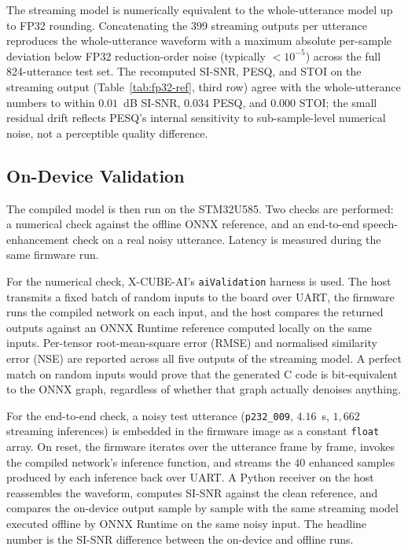 \documentclass[conference]{IEEEtran}
\begin{document}
The streaming model is numerically equivalent to the whole-utterance model up to FP32 rounding. Concatenating the 399 streaming outputs per utterance reproduces the whole-utterance waveform with a maximum absolute per-sample deviation below FP32 reduction-order noise (typically $<10^{-5}$) across the full 824-utterance test set. The recomputed SI-SNR, PESQ, and STOI on the streaming output (Table~\ref{tab:fp32-ref}, third row) agree with the whole-utterance numbers to within $0.01$~dB SI-SNR, $0.034$ PESQ, and $0.000$ STOI; the small residual drift reflects PESQ's internal sensitivity to sub-sample-level numerical noise, not a perceptible quality difference.


\subsection{On-Device Validation}
The compiled model is then run on the STM32U585. Two checks are performed: a numerical check against the offline ONNX reference, and an end-to-end speech-enhancement check on a real noisy utterance. Latency is measured during the same firmware run.

For the numerical check, X-CUBE-AI's \texttt{aiValidation} harness is used. The host transmits a fixed batch of random inputs to the board over UART, the firmware runs the compiled network on each input, and the host compares the returned outputs against an ONNX Runtime reference computed locally on the same inputs. Per-tensor root-mean-square error (RMSE) and normalised similarity error (NSE) are reported across all five outputs of the streaming model. A perfect match on random inputs would prove that the generated C code is bit-equivalent to the ONNX graph, regardless of whether that graph actually denoises anything.

For the end-to-end check, a noisy test utterance (\texttt{p232\_009}, $4.16$~s, $1{,}662$ streaming inferences) is embedded in the firmware image as a constant \texttt{float} array. On reset, the firmware iterates over the utterance frame by frame, invokes the compiled network's inference function, and streams the $40$ enhanced samples produced by each inference back over UART. A Python receiver on the host reassembles the waveform, computes SI-SNR against the clean reference, and compares the on-device output sample by sample with the same streaming model executed offline by ONNX Runtime on the same noisy input. The headline number is the SI-SNR difference between the on-device and offline runs.
\end{document}

